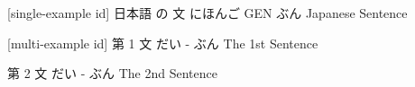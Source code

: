 [single-example id]
日本語   の  文	
にほんご GEN ぶん
Japanese Sentence

[multi-example id]
第   1  文
だい -  ぶん
The 1st Sentence
   
第   2  文
だい - ぶん
The 2nd Sentence
